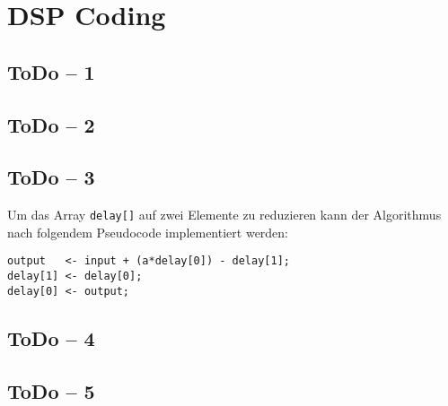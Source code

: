 \section{DSP Coding}

\subsection{ToDo -- 1}


\subsection{ToDo -- 2}


\subsection{ToDo -- 3}
Um das Array \lstinline{delay[]} auf zwei Elemente zu reduzieren kann der
Algorithmus nach folgendem Pseudocode implementiert werden:

\begin{lstlisting}
output   <- input + (a*delay[0]) - delay[1];
delay[1] <- delay[0];
delay[0] <- output;
\end{lstlisting}

\subsection{ToDo -- 4}


\subsection{ToDo -- 5}
